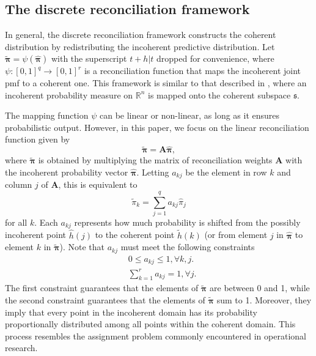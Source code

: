 \documentclass[a4paper,review,12pt,authoryear]{elsarticle}
\newcommand{\bpi}{\bm{\pi}}
\begin{document}
    \subsection{The discrete reconciliation framework}
    
    In general, the discrete reconciliation framework constructs the coherent distribution by redistributing the incoherent predictive distribution. 
    Let $\tilde{\bpi} = \psi(\hat{\bpi})$ with the superscript $t+h|t$ dropped for convenience, where $\psi:[0,1]^q \rightarrow [0,1]^r$ is a reconciliation function that maps the incoherent joint pmf to a coherent one. 
    This framework is similar to that described in \cite{panagiotelisProbabilisticForecastReconciliation2022}, where an incoherent probability measure on $\mathbb{R}^n$ is mapped onto the coherent subspace $\mathfrak{s}$.

    The mapping function $\psi$ can be linear or non-linear, as long as it ensures probabilistic output. 
    However, in this paper, we focus on the linear reconciliation function given by
    \begin{equation}
      \label{eq:framework}
    \tilde{\bpi}=\bm{A}\hat{\bpi},
    \end{equation}
    where $\tilde{\bpi}$ is obtained by multiplying the matrix of reconciliation weights $\bm{A}$ with the incoherent probability vector $\hat{\bpi}$. Letting $a_{kj}$ be the element in row $k$ and column $j$ of $\bm{A}$, this is equivalent to
    \[
      \tilde{\pi}_k=\sum\limits_{j=1}^q a_{kj}\hat{{\pi}}_j
    \]
    for all $k$. 
    Each $a_{kj}$ represents how much probability is shifted from the possibly incoherent point $\hat{h}(j)$ to the coherent point $\tilde{h}(k)$ (or from element $j$ in $\hat{\bpi}$ to element $k$ in $\tilde{\bpi}$). Note that $a_{kj}$ must meet the following constraints
    \begin{align*}
    &0\leq a_{kj} \leq 1 ,\forall k, j.\\ 
    &\sum\limits_{k=1}^r a_{kj} = 1 ,\forall j. 
    \end{align*}
    The first constraint guarantees that the elements of $\tilde{\bpi}$ are between 0 and 1, while the second constraint guarantees that the elements of $\tilde{\bpi}$ sum to 1.
    Moreover, they imply that every point in the incoherent domain has its probability proportionally distributed among all points  within the coherent domain. 
    This process resembles the assignment problem commonly encountered in operational research.
    
\end{document}
